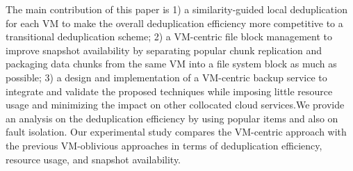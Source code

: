The main contribution of this paper is
1) a similarity-guided local deduplication for
each VM to make the overall deduplication efficiency more competitive 
to a transitional deduplication scheme;
2) a VM-centric file block management to improve snapshot availability by
separating popular chunk replication and
packaging data chunks from the same VM into a file system block as much as possible; 
3) a design and implementation of a VM-centric  backup service to integrate and validate
the proposed techniques while imposing  little resource usage and  minimizing the impact on other 
collocated cloud services.We provide an analysis on the deduplication efficiency by using popular items
and also on fault isolation.
Our  experimental study compares  the VM-centric approach with the previous 
VM-oblivious approaches in terms of deduplication efficiency, resource usage,  and snapshot availability.

 



